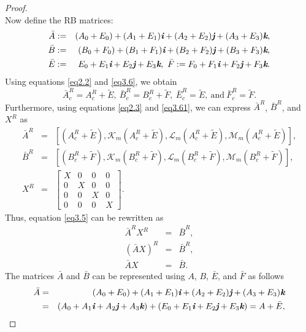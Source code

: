 \documentclass[preprint,11pt,3p]{elsarticle}
\def \i{\textit{\textbf{i}}}
\def \j{\textit{\textbf{j}}}
\def \k{\textit{\textbf{k}}}
\begin{document}
\begin{proof}
\begin{equation}
	\end{equation}
	Now define the RB matrices:
	\begin{eqnarray*}
		\bar{A}&:=& (A_{0}+E_{0})+ (A_{1}+E_{1})\i+ (A_{2}+E_{2})\j+ (A_{3}+E_{3})\k, \\
		\bar{B}&:=& (B_0+ F_0)+ (B_1+ F_1)\i+ (B_2+ F_2)\j+ (B_3+ F_3)\k, \\
		\bar{E}&:=& E_{0}+ E_{1}\i+ E_{2}\j+ E_{3}\k, ~ \bar{F}:= F_0+ F_1\i+ F_2\j+ F_3\k.
	\end{eqnarray*}
	Using equations \eqref{eq2.2} and \eqref{eq3.6}, we obtain
	\begin{equation}\label{eq3.61}
		\bar{A}_c^R= A^R_c+ \widetilde{E}, ~	\bar{B}_c^R= B^R_c+\widetilde{F}, ~ \bar{E}_c^R=  \widetilde{E}, ~ \textrm{and} ~ \bar{F}_c^R= \widetilde{F}.
	\end{equation}
Furthermore, using equations \eqref{eq2.3} and \eqref{eq3.61}, we can express $\bar{A}^R$, $\bar{B}^R$, and $X^R$ as
	\begin{eqnarray*}
		\bar{A}^R&=& \left[(A^R_c+ \widetilde{E}), \mathcal{K}_m(A^R_c+ \widetilde{E}), \mathcal{L}_m(A^R_c+ \widetilde{E}), \mathcal{M}_m(A^R_c+ \widetilde{E})\right], \\
		\bar{B}^R&=& \left[(B^R_c+\widetilde{F}), \mathcal{K}_m(B^R_c+\widetilde{F}), \mathcal{L}_m(B^R_c+\widetilde{F}), \mathcal{M}_m(B^R_c+\widetilde{F})\right],\\
		X^R&=& 
		\begin{bmatrix}
			X & 0 & 0 & 0 \\
			0 & X & 0 & 0 \\
			0 & 0 & X & 0 \\
			0 & 0 & 0 & X
		\end{bmatrix}.
	\end{eqnarray*}
	Thus, equation \eqref{eq3.5} can be rewritten as
	\begin{eqnarray}
		\bar{A}^R X^R&=& \bar{B}^R, \label{eq3.7}\\
		(\bar{A}X)^R&=& \bar{B}^R, \nonumber\\
		\bar{A}X&=& \bar{B}. \label{eq3.8}
	\end{eqnarray}
	The matrices $\bar{A}$ and $\bar{B}$ can be represented using $A$, $B$, $\bar{E}$, and $\bar{F}$ as follows
	\begin{eqnarray}
		\bar{A}&=& (A_{0}+ E_{0})+ (A_{1}+ E_{1})\i+ (A_{2}+ E_{2})\j+ (A_{3}+ E_{3})\k \nonumber \\
		&=& (A_0+ A_1\i+ A_2\j+ A_3\k)+ (E_0 +E_1\i+ E_2\j+ E_3\k) = A+ \bar{E}, \label{eq3.9}
	\end{eqnarray}

\end{proof}
\end{document}
